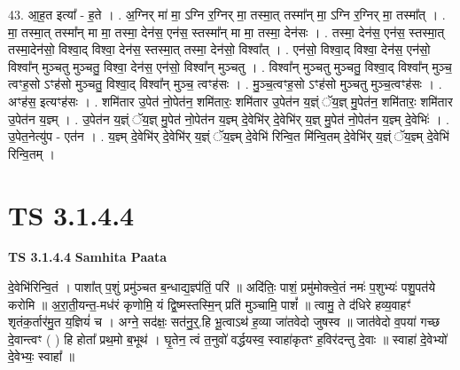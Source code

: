 \documentclass[17pt]{extarticle}
\begin{document}
43. आ॒ह॒त इत्या᳚ - ह॒ते । . अ॒ग्निर् मा॑ मा॒ ऽग्नि र॒ग्निर् मा॒ तस्मा॒त् तस्मा᳚न् मा॒ ऽग्नि र॒ग्निर् मा॒ तस्मा᳚त् । . मा॒ तस्मा॒त् तस्मा᳚न् मा मा॒ तस्मा॒ देन॑स॒ एन॑स॒ स्तस्मा᳚न् मा मा॒ तस्मा॒ देन॑सः । . तस्मा॒ देन॑स॒ एन॑स॒ स्तस्मा॒त् तस्मा॒देन॑सो॒ विश्वा॒द् विश्वा॒ देन॑स॒ स्तस्मा॒त् तस्मा॒ देन॑सो॒ विश्वा᳚त् । . एन॑सो॒ विश्वा॒द् विश्वा॒ देन॑स॒ एन॑सो॒ विश्वा᳚न् मुञ्चतु मुञ्चतु॒ विश्वा॒ देन॑स॒ एन॑सो॒ विश्वा᳚न् मुञ्चतु । . विश्वा᳚न् मुञ्चतु मुञ्चतु॒ विश्वा॒द् विश्वा᳚न् मुञ्च॒ त्वꣳह॒सो ऽꣳह॑सो मुञ्चतु॒ विश्वा॒द् विश्वा᳚न् मुञ्च॒ त्वꣳह॑सः । . मु॒ञ्च॒त्वꣳह॒सो ऽꣳह॑सो मुञ्चतु मुञ्च॒त्वꣳह॑सः । . अꣳह॑स॒ इत्यꣳह॑सः । . शमि॑तार उ॒पेत॑ नो॒पेत॑न॒ शमि॑तारः॒ शमि॑तार उ॒पेत॑न य॒ज्ञ्ं ॅय॒ज्ञ् मु॒पेत॑न॒ शमि॑तारः॒ शमि॑तार उ॒पेत॑न य॒ज्ञ्म् । . उ॒पेत॑न य॒ज्ञ्ं ॅय॒ज्ञ् मु॒पेत॑ नो॒पेत॑न य॒ज्ञ्म् दे॒वेभि॑र् दे॒वेभि॑र् य॒ज्ञ् मु॒पेत॑ नो॒पेत॑न य॒ज्ञ्म् दे॒वेभिः॑ । . उ॒पेत॒नेत्यु॑प - एत॑न । . य॒ज्ञ्म् दे॒वेभि॑र् दे॒वेभि॑र् य॒ज्ञ्ं ॅय॒ज्ञ्म् दे॒वेभि॑ रिन्वि॒त मि॑न्वि॒तम् दे॒वेभि॑र् य॒ज्ञ्ं ॅय॒ज्ञ्म् दे॒वेभि॑ रिन्वि॒तम् । \newline
\pagebreak
{}

\section{ TS 3.1.4.4 }

\textbf{TS 3.1.4.4 } \newline
\textbf{Samhita Paata} \newline

दे॒वेभि॑रिन्वि॒तं । पाशा᳚त् प॒शुं प्रमु॑ञ्चत ब॒न्धाद्य॒ज्ञ्प॑तिं॒ परि॑ ॥ अदि॑तिः॒ पाशं॒ प्रमु॑मोक्त्वे॒तं नमः॑ प॒शुभ्यः॑ पशु॒पत॑ये करोमि ॥ अ॒रा॒ती॒यन्त॒-मध॑रं कृणोमि॒ यं द्वि॒ष्मस्तस्मि॒न् प्रति॑ मुञ्चामि॒ पाशं᳚ ॥ त्वामु॒ ते द॑धिरे हव्य॒वाहꣳ॑ शृतंक॒र्तार॑मु॒त य॒ज्ञियं॑ च । अग्ने॒ सद॑क्षः॒ सत॑नु॒र्॒.हि भू॒त्वाऽथ॑ ह॒व्या जा॑तवेदो जुषस्व ॥ जात॑वेदो व॒पया॑ गच्छ दे॒वान्त्वꣳ ( ) हि होता᳚ प्रथ॒मो ब॒भूथ॑ । घृ॒तेन॒ त्वं त॒नुवो॑ वर्द्धयस्व॒ स्वाहा॑कृतꣳ ह॒विर॑दन्तु दे॒वाः ॥ स्वाहा॑ दे॒वेभ्यो॑ दे॒वेभ्यः॒ स्वाहा᳚ ॥ \newline
\end{document}
